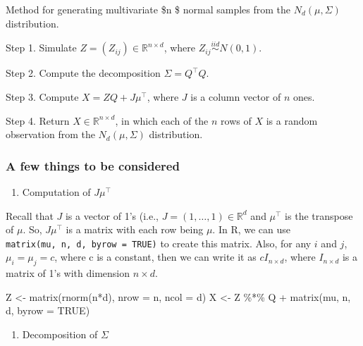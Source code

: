 \documentclass[
  letterpaper,
  DIV=11,
  numbers=noendperiod]{scrreprt}
\newenvironment{Shaded}{\begin{snugshade}}{\end{snugshade}}
\newcommand{\AttributeTok}[1]{\textcolor[rgb]{0.40,0.45,0.13}{#1}}
\newcommand{\ConstantTok}[1]{\textcolor[rgb]{0.56,0.35,0.01}{#1}}
\newcommand{\FunctionTok}[1]{\textcolor[rgb]{0.28,0.35,0.67}{#1}}
\newcommand{\NormalTok}[1]{\textcolor[rgb]{0.00,0.23,0.31}{#1}}
\newcommand{\OtherTok}[1]{\textcolor[rgb]{0.00,0.23,0.31}{#1}}
\newcommand{\SpecialCharTok}[1]{\textcolor[rgb]{0.37,0.37,0.37}{#1}}
\providecommand{\tightlist}{%
  \setlength{\itemsep}{0pt}\setlength{\parskip}{0pt}}
\begin{document}
Method for generating multivariate \$n \$ normal samples from the
\(N_d(\mu,\Sigma)\) distribution.

Step 1. Simulate \(Z = (Z_{ij}) \in \mathbb{R}^{n\times d}\), where
\(Z_{ij} \overset{iid}{\sim}N(0,1)\).

Step 2. Compute the decomposition \(\Sigma = Q^\top Q\).

Step 3. Compute \(X = ZQ + J\mu^\top\), where \(J\) is a column vector
of \(n\) ones.

Step 4. Return \(X\in \mathbb{R}^{ n\times d}\), in which each of the
\(n\) rows of \(X\) is a random observation from the \(N_d(\mu,\Sigma)\)
distribution.

\subsubsection{A few things to be
considered}\label{a-few-things-to-be-considered}

\begin{enumerate}
\def\labelenumi{\arabic{enumi}.}
\tightlist
\item
  Computation of \(J \mu^\top\)
\end{enumerate}

Recall that \(J\) is a vector of 1's (i.e.,
\(J=(1,\dots,1)\in\mathbb{R}^d\) and \(\mu^\top\) is the transpose of
\(\mu\). So, \(J \mu^\top\) is a matrix with each row being \(\mu\). In
R, we can use \texttt{matrix(mu,\ n,\ d,\ byrow\ =\ TRUE)} to create
this matrix. Also, for any \(i\) and \(j\), \(\mu_i=\mu_j=c\), where c
is a constant, then we can write it as \(c I_{n\times d}\), where
\(I_{n\times d}\) is a matrix of 1's with dimension \(n\times d\).

\begin{Shaded}
\begin{Highlighting}[]
\NormalTok{Z }\OtherTok{\textless{}{-}} \FunctionTok{matrix}\NormalTok{(}\FunctionTok{rnorm}\NormalTok{(n}\SpecialCharTok{*}\NormalTok{d), }\AttributeTok{nrow =}\NormalTok{ n, }\AttributeTok{ncol =}\NormalTok{ d)}
\NormalTok{X }\OtherTok{\textless{}{-}}\NormalTok{ Z }\SpecialCharTok{\%*\%}\NormalTok{ Q }\SpecialCharTok{+} \FunctionTok{matrix}\NormalTok{(mu, n, d, }\AttributeTok{byrow =} \ConstantTok{TRUE}\NormalTok{)}
\end{Highlighting}
\end{Shaded}

\begin{enumerate}
\def\labelenumi{\arabic{enumi}.}
\setcounter{enumi}{1}
\tightlist
\item
  Decomposition of \(\Sigma\)
\end{enumerate}
\end{document}
